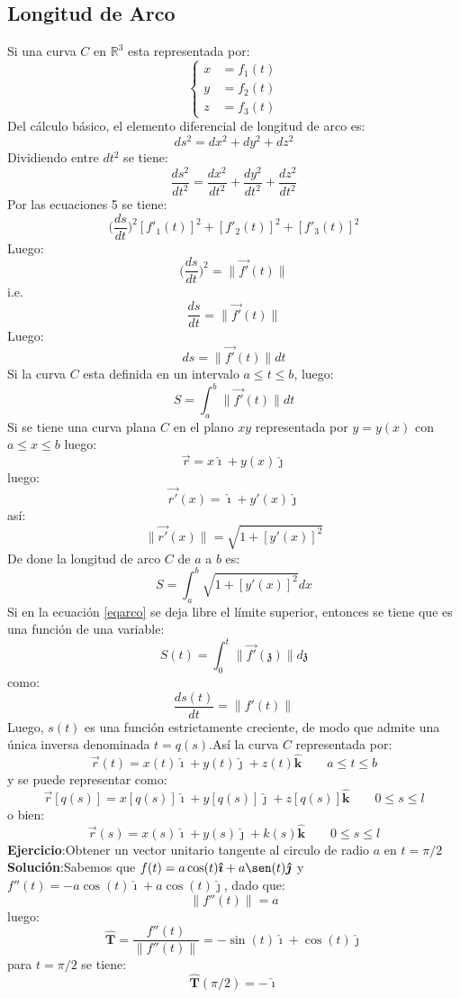 \documentclass[a4paper]{article}
\newcommand{\ihat}{\boldsymbol{\hat{\imath}}}
\newcommand{\jhat}{\boldsymbol{\hat{\jmath}}}
\newcommand{\khat}{\boldsymbol{\hat{\bm{k}}}}
\begin{document}
\subsection{Longitud de Arco}
Si una curva $C$ en $\mathbb{R}^3$ esta representada por:
\begin{equation}
\begin{cases}
x&=f_1(t)\\
y&=f_2(t)\\
z&=f_3(t)
\end{cases}
\end{equation}
Del cálculo básico, el elemento diferencial de longitud de arco es:
\[ds^2=dx^2+dy^2+dz^2\]
Dividiendo entre $dt^2$ se tiene:
\[\frac{ds^2}{dt^2}=\frac{dx^2}{dt^2}+\frac{dy^2}{dt^2}+\frac{dz^2}{dt^2}\]
Por las ecuaciones 5 se tiene:
\[\Big(\frac{ds}{dt}\Big)^2[f'_1(t)]^2+[f'_2(t)]^2+[f'_3(t)]^2\]
Luego:
\[\Big(\frac{ds}{dt}\Big)^2=\lVert\vec{f'}(t)\rVert\]
i.e.
\[\frac{ds}{dt}=\lVert\vec{f'}(t)\rVert\]
Luego:
\[ds=\lVert\vec{f'}(t)\rVert dt\]
Si la curva $C$ esta definida en un intervalo $a\leq t\leq b$, luego:
\begin{equation}
\label{eqarco}
S=\int_a^b \lVert\vec{f'}(t)\rVert dt
\end{equation}
Si se tiene una curva plana $C$ en el plano $xy$ representada por $y=y(x)$ con $a\leq x \leq b$ luego:
\[\vec{r}=x\ihat+y(x)\jhat\] 
luego:
\[\vec{r'}(x)=\ihat+y'(x)\jhat\]
así:
\[\lVert \vec{r'}(x)\rVert=\sqrt{1+[y'(x)]^2}\]
De done la longitud de arco $C$ de $a$ a $b$ es:
\[S=\int_a^b\sqrt{1+[y'(x)]^2} dx\]
Si en la ecuación \ref{eqarco} se deja libre el límite superior, entonces se tiene que es una función de una variable:
\begin{equation}
S(t)=\int_0^t \lVert \vec{f'}(\mathfrak{z})\lVert d\mathfrak{z}
\end{equation}
como:
\[\frac{ds(t)}{dt}=\lVert f'(t)\rVert\]
Luego, $s(t)$ es una función estrictamente creciente, de modo que admite una única inversa 
denominada $t=q(s)$.Así la curva $C$ representada por:
\begin{equation}
\vec{r}(t)=x(t)\ihat+y(t)\jhat+z(t)\khat \qquad a\leq t\leq b
\end{equation}
y se puede representar como:
\[\vec{r}[q(s)]=x[q(s)]\ihat+y[q(s)]\jhat+z[q(s)]\khat\qquad 0\leq s\leq l\]
o bien:
\begin{equation}
\vec{r}(s)=x(s)\ihat+y(s)\jhat+k(s)\khat\qquad 0\leq s\leq l
\end{equation}
\textbf{Ejercicio}:Obtener un vector unitario tangente al circulo de radio $a$ en $t=\pi/2$\\[2ex]
\textbf{Solución}:Sabemos que $f(t)=a\cos(t)\ihat+a\sen(t)\jhat$ y $f''(t)=-a\cos(t)\ihat+a\cos(t)\jhat$, dado que:
\[\lVert f''(t)\rVert=a\]
luego:
\[\mathbf{\hat{T}}=\frac{f''(t)}{\lVert f''(t) \rVert}=-\sin(t)\ihat+\cos(t)\jhat\]
para $t=\pi/2$ se tiene:
\[\mathbf{\hat{T}}(\pi/2)=-\ihat\]
\end{document}
